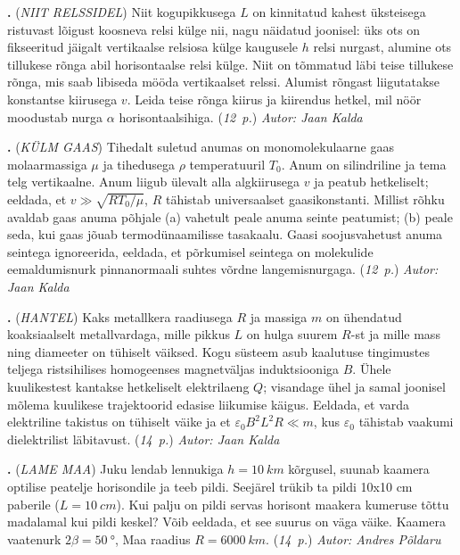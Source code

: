 \documentclass[11pt,a5paper]{article}
\newcommand{\numb}[1]{\vspace{5pt}\textbf{\large #1}}
\newcommand{\nimi}[1]{(\textsl{\small #1})}
\newcommand{\punktid}[1]{(\emph{#1~p.})}
\newcommand{\autor}[1]{\emph{ Autor: #1}}
\newcounter{ylesanne}
\newcommand{\yl}[1]{\addtocounter{ylesanne}{1}\numb{\theylesanne.} \nimi{#1} \newblock{}}
\begin{document}
\yl{NIIT RELSSIDEL}
Niit kogupikkusega $L$ on kinnitatud kahest üksteisega ristuvast lõigust koosneva relsi külge nii, nagu näidatud joonisel: üks ots on fikseeritud jäigalt vertikaalse relsiosa külge kaugusele $h$ relsi nurgast, alumine ots tillukese rõnga abil horisontaalse relsi külge. Niit on tõmmatud läbi teise tillukese rõnga, mis saab libiseda mööda vertikaalset relssi. Alumist rõngast liigutatakse konstantse kiirusega $v$. Leida teise rõnga kiirus ja kiirendus hetkel, mil nöör moodustab nurga $\alpha$ horisontaalsihiga.
\punktid{12} \autor{Jaan Kalda}

\yl{KÜLM GAAS}
Tihedalt suletud anumas on monomolekulaarne gaas molaarmassiga $\mu$ ja tihedusega $\rho$ temperatuuril $T_0$. Anum on silindriline ja tema telg vertikaalne. Anum liigub ülevalt alla algkiirusega $v$ ja peatub hetkeliselt; eeldada, et $v\gg \sqrt{RT_0/\mu}$, $R$ tähistab universaalset gaasikonstanti. Millist rõhku avaldab gaas anuma põhjale (a) vahetult peale anuma seinte peatumist; (b) peale seda, kui gaas jõuab termodünaamilisse tasakaalu. Gaasi soojusvahetust anuma seintega ignoreerida, eeldada, et põrkumisel seintega on molekulide eemaldumisnurk pinnanormaali suhtes võrdne langemisnurgaga.
\punktid{12} \autor{Jaan Kalda}

\yl{HANTEL}
Kaks metallkera raadiusega $R$ ja massiga $m$ on ühendatud koaksiaalselt metallvardaga, mille pikkus $L$ on hulga suurem $R$-st ja mille mass ning diameeter on tühiselt väiksed. Kogu süsteem asub kaalutuse tingimustes teljega ristsihilises homogeenses magnetväljas induktsiooniga $B$. Ühele kuulikestest kantakse hetkeliselt elektrilaeng $Q$; visandage ühel ja samal joonisel mõlema kuulikese trajektoorid edasise liikumise käigus. Eeldada, et varda elektriline takistus on tühiselt väike ja et $\varepsilon_0B^2L^2R\ll m$, kus $\varepsilon_0$ tähistab vaakumi dielektrilist läbitavust.
\punktid{14} \autor{Jaan Kalda}


\yl{LAME MAA}
Juku lendab lennukiga $h=\SI{10}{km}$ kõrgusel, suunab kaamera optilise peatelje horisondile ja teeb pildi. Seejärel trükib ta pildi 10x10 cm paberile ($L=\SI{10}{cm}$). Kui palju on pildi servas horisont maakera kumeruse tõttu madalamal kui pildi keskel? Võib eeldada, et see suurus on väga väike. Kaamera vaatenurk $2\beta=\SI{50}{\degree}$, Maa raadius $R=\SI{6000}{km}$. \punktid{14} \autor{Andres Põldaru}
\end{document}
